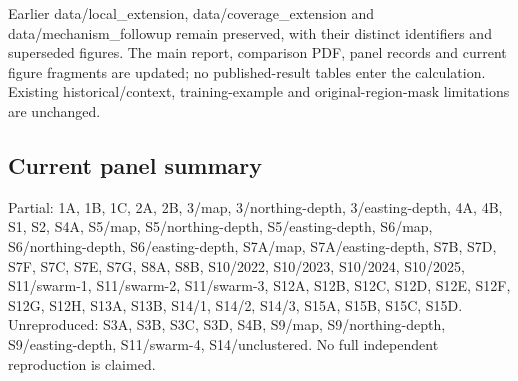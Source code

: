 Earlier data/local\_extension, data/coverage\_extension and data/mechanism\_followup remain preserved, with their distinct identifiers and superseded figures. The main report, comparison PDF, panel records and current figure fragments are updated; no published-result tables enter the calculation. Existing historical/context, training-example and original-region-mask limitations are unchanged.

\subsection*{Current panel summary}

Partial: 1A, 1B, 1C, 2A, 2B, 3/map, 3/northing-depth, 3/easting-depth, 4A, 4B, S1, S2, S4A, S5/map, S5/northing-depth, S5/easting-depth, S6/map, S6/northing-depth, S6/easting-depth, S7A/map, S7A/easting-depth, S7B, S7D, S7F, S7C, S7E, S7G, S8A, S8B, S10/2022, S10/2023, S10/2024, S10/2025, S11/swarm-1, S11/swarm-2, S11/swarm-3, S12A, S12B, S12C, S12D, S12E, S12F, S12G, S12H, S13A, S13B, S14/1, S14/2, S14/3, S15A, S15B, S15C, S15D. Unreproduced: S3A, S3B, S3C, S3D, S4B, S9/map, S9/northing-depth, S9/easting-depth, S11/swarm-4, S14/unclustered. No full independent reproduction is claimed.
